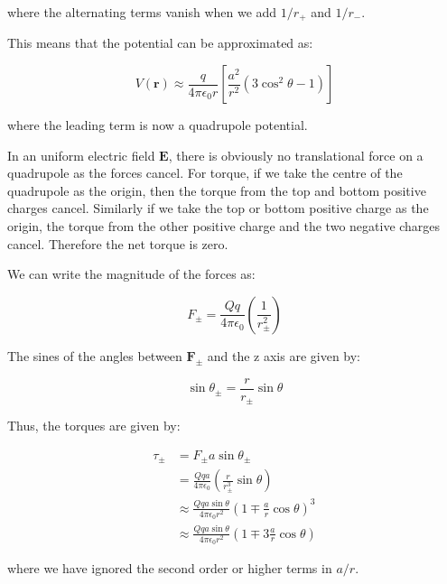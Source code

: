 \documentclass[12pt]{article}
\begin{document}
where the alternating terms vanish when we add $1/r_{+}$ and $1/r_{-}$.

This means that the potential can be approximated as:

\begin{equation}
    V(\mathbf{r}) \approx \frac{q}{4\pi\epsilon_{0}r} \left[ \frac{a^{2}}{r^{2}} \left( 3 \cos^{2}{\theta} - 1 \right) \right]
\end{equation}

where the leading term is now a quadrupole potential.

In an uniform electric field $\mathbf{E}$, there is obviously no translational force on a quadrupole as the forces cancel. For torque, if we take the centre of the quadrupole as the origin, then the torque from the top and bottom positive charges cancel. Similarly if we take the top or bottom positive charge as the origin, the torque from the other positive charge and the two negative charges cancel. Therefore the net torque is zero.

We can write the magnitude of the forces as:

\begin{equation}
    F_{\pm} = \frac{Qq}{4\pi\epsilon_{0}} \left( \frac{1}{r_{\pm}^{2}} \right)
\end{equation}

The sines of the angles between $\mathbf{F}_{\pm}$ and the z axis are given by:

\begin{equation}
    \sin{\theta_{\pm}} = \frac{r}{r_{\pm}} \sin{\theta}
\end{equation}

Thus, the torques are given by:

\begin{equation}
\begin{split}
    \tau_{\pm} &= F_{\pm} a \sin{\theta_{\pm}} \\
    &= \frac{Qqa}{4\pi\epsilon_{0}} \left( \frac{r}{r_{\pm}^{3}} \sin{\theta} \right) \\
    &\approx \frac{Qqa\sin{\theta}}{4\pi\epsilon_{0}r^{2}} \left( 1 \mp \frac{a}{r} \cos{\theta} \right)^{3} \\
    &\approx \frac{Qqa\sin{\theta}}{4\pi\epsilon_{0}r^{2}} \left( 1 \mp 3\frac{a}{r} \cos{\theta} \right)
\end{split}
\end{equation}

where we have ignored the second order or higher terms in $a/r$.
\end{document}
